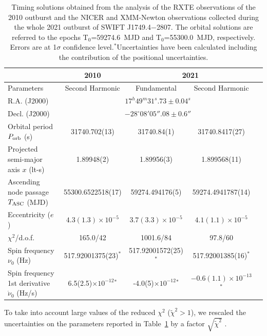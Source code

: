 \documentclass[fleqn,usenatbib]{mnras}
\newcommand{\swiftj}{SWIFT J1749.4$-$2807}
\newcommand{\nicer}{NICER}
\newcommand{\xmm}{XMM-Newton}
\newcommand{\rxte}{RXTE}
\begin{document}
\begin{table}

\begin{tabular}{l | c  c  c  c}
\hline
&  2010 & \multicolumn{2}{c}{2021} \\
\hline
Parameters   &    Second Harmonic      & Fundamental & Second Harmonic\\
\hline
\hline
R.A. (J2000) &  \multicolumn{3}{c}{$17^h49^m31^s.73\pm0.04^s\!$}\\
Decl. (J2000) & \multicolumn{3}{c}{$-28^\circ08'05''.08\pm0.6''$} \\
Orbital period $P_{\rm orb}$ (s) & 31740.702(13) & 31740.84(1) & 31740.8417(27)\\
Projected semi-major axis $x$ (lt-s) & 1.89948(2) & 1.89956(3) &1.899568(11) \\
Ascending node passage $T_{{\rm ASC}}$ (MJD) & 55300.6522518(17) & 59274.494176(5) & 59274.4941787(14)\\
Eccentricity ($e$) & $4.3(1.3)\times 10^{-5}$ & $3.7(3.3)\times 10^{-5}$ &$4.1(1.1)\times 10^{-5}$\\
$\chi^2$/d.o.f. & 165.0/42 & 1001.6/84 & 97.8/60\\
\hline
\hline
Spin frequency $\nu_0$ (Hz) & 517.92001375(23)$^*$ &517.92001572(25)$^*$& 517.92001385(16)$^*$\\
Spin frequency 1st derivative $\dot{\nu}_0$ (Hz/s) & 6.5(2.5)$\times 10^{-12}$$^*$ &-4.0(5)$\times 10^{-12}$$^*$&$-0.6(1.1)\times 10^{-13}$$^*$\\
\hline
\end{tabular}
\caption{Timing solutions obtained from the analysis of the \rxte{} observations of the 2010 outburst and the \nicer{} and \xmm{} observations collected during the whole 2021 outburst of \swiftj{}. The orbital solutions are  referred to the epochs T$_0$=59274.6~MJD and T$_0$=55300.0~MJD, respectively. Errors are at 1$\sigma$ confidence level.$^*$Uncertainties have been calculated including the contribution of the positional uncertainties.}
\label{tab:solution}
\end{table}

To take into account large values of the reduced $\chi^2$ ($\tilde{\chi}^2>1$), we rescaled the uncertainties on the parameters reported in Table~\ref{tab:solution} by a factor $\sqrt{\tilde{\chi}^2}$ \citep[see e.g.,][]{Finger:1999vb}.
\end{document}
